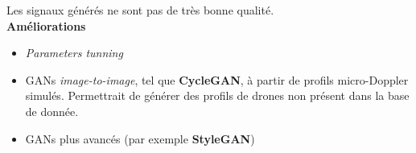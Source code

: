 \documentclass[a0,portrait]{a0poster}
\begin{document}
\begin{multicols}{2}

\begin{tcolorbox}[colback=red!5!orange,colframe=red!75!black,title={\section*{Perspectives}}]
Les signaux générés ne sont pas de très bonne qualité.\\
\textbf{Améliorations}
\begin{itemize}
    \item \textit{Parameters tunning}
    \item GANs \textit{image-to-image}, tel que \textbf{CycleGAN}, à partir de profils micro-Doppler simulés. Permettrait de générer des profils de drones non présent dans la base de donnée.
    \item GANs plus avancés (par exemple \textbf{StyleGAN})
\end{itemize}
\end{tcolorbox}

\end{multicols}
\end{document}
